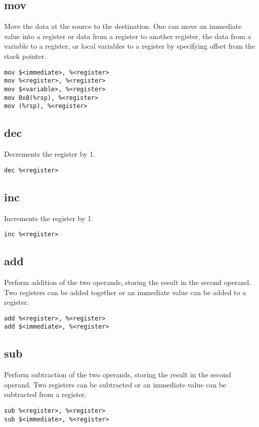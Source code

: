 \documentclass[reqno,a4paper,11pt]{amsart}
\begin{document}
\subsection{mov}
Move the data at the source to the destination. One can move an immediate value
into a register or data from a register to another register, the data from
a variable to a register, or local variables to a register by specifying offset
from the stack pointer.
\begin{lstlisting}
mov $<immediate>, %<register>
mov %<register>, %<register>
mov $<variable>, %<register>
mov 0x8(%rsp), %<register>
mov (%rsp), %<register>
\end{lstlisting}
\subsection{dec}
Decrements the register by 1.
\begin{lstlisting}
dec %<register>
\end{lstlisting}
\subsection{inc}
Increments the register by 1.
\begin{lstlisting}
inc %<register>
\end{lstlisting}
\subsection{add}
Perform addition of the two operands, storing the result in the second operand.
Two registers can be added together or an immediate value can be added to
a register.
\begin{lstlisting}
add %<register>, %<register>
add $<immediate>, %<register>
\end{lstlisting}
\subsection{sub}
Perform subtraction of the two operands, storing the result in the second 
operand. Two registers can be subtracted or an immediate value can be 
subtracted from a register.
\begin{lstlisting}
sub %<register>, %<register>
sub $<immediate>, %<register>
\end{lstlisting}
\end{document}

